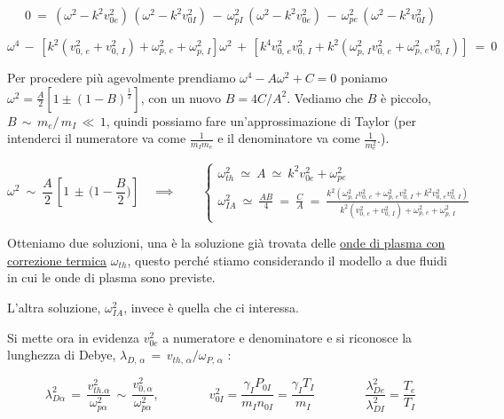 \[0 \ =\ (\omega^2-k^2v_{0e}^2)\,(\omega^2-k^2v_{0I}^2)\, -\,\omega_{pI}^2\,(\omega^2-k^2v_{0e}^2)\, -\, \omega_{pe}^2\, (\omega^2-k^2v_{0I}^2)\]

\[\omega^4\, -\,\left[k^2(v^2_{0,\,e}+v^2_{0,\,I})+ \omega^2_{p,\,e} + \omega^2_{p,\,I}\right]\omega^2\, +\, [k^4 v^2_{0,\,e} v^2_{0,\,I} + k^2(\omega^2_{p,\,I}v^2_{0,\,e}+\omega^2_{p,\,e}v^2_{0,\,I})]\ =\ 0\]

Per procedere più agevolmente prendiamo $\omega^4-A\omega^2+C=0$ poniamo $\omega^2=\frac{A}{2}[1\pm(1-B)^\frac{1}{2}]$, con un nuovo $B=4C/A^2$. Vediamo che $B$ è piccolo, $B\,\sim\,m_e/\,m_I\,\ll\, 1$, quindi possiamo fare un'approssimazione di Taylor (per intenderci il numeratore va come $\displaystyle\frac{1}{m_Im_e}$ e il denominatore va come $\displaystyle\frac{1}{m_e^2}$.).


\[\omega^2\ \sim\ \frac{A}{2}\,\left[1\,\pm\,\big(1-\frac{B}{2}\big)\right]
\quad \implies \qquad 
\begin{cases}
	\omega_{th}^2\ \simeq\ A\ \simeq\ k^2v_{0e}^2+\omega_{pe}^2\\
	\omega^2_{IA}\ \simeq\ \frac{AB}{4}\ =\ \frac{C}{A}\ =\ \frac{ k^2(\omega^2_{p,\,I}v^2_{0,\,e}+\omega^2_{p,\,e}v^2_{0,\,I} + k^2 v^2_{0,\,e} v^2_{0,\,I} )}{k^2(v^2_{0,\,e}+v^2_{0,\,I})+ \omega^2_{p,\,e} + \omega^2_{p,\,I}}
\end{cases}
\]

Otteniamo due soluzioni, una è la soluzione già trovata delle \underline{onde di plasma con correzione termica} $\omega_{th}$, questo perché stiamo considerando il modello a due fluidi in cui le onde di plasma sono previste. 

L'altra soluzione, $\omega^2_{IA}$, invece è quella che ci interessa.

Si mette ora in evidenza $v_{0e}^2$ a numeratore e denominatore e si riconosce la lunghezza di Debye, $\lambda_{D,\, \alpha}\,=\,v_{th,\,\alpha}/\omega_{P,\,\alpha}$ :  

\[\lambda _{D\alpha}^2\,=\,\frac{v_{th.\alpha}^2}{\omega_{p\alpha}^2}\,\sim\, \frac{v_{0,\alpha}^2}{\omega_{p\alpha}^2},
\qquad\qquad
v_{0I}^2=\frac{\gamma_IP_{0I}}{m_In_{0I}}=\frac{\gamma_IT_{I}}{m_I}
\qquad\qquad
\frac{\lambda^2_{De}}{\lambda^2_{DI}}=\frac{T_e}{T_I}\] 

